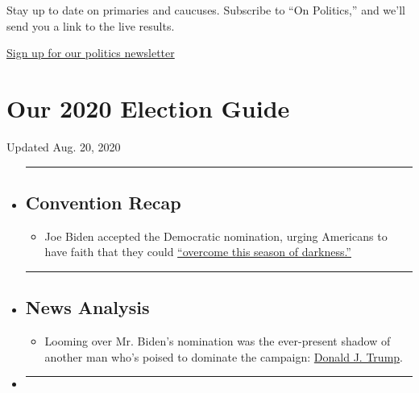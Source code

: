 Stay up to date on primaries and caucuses. Subscribe to ``On Politics,''
and we'll send you a link to the live results.

\href{https://www.nytimes3xbfgragh.onion/newsletters/politics}{Sign up
for our politics newsletter}

\hypertarget{our-2020-election-guide}{%
\section{Our 2020 Election Guide}\label{our-2020-election-guide}}

Updated Aug. 20, 2020

\begin{itemize}
\item
  \begin{center}\rule{0.5\linewidth}{\linethickness}\end{center}

  \hypertarget{convention-recap}{%
  \subsection{Convention Recap}\label{convention-recap}}

  \begin{itemize}
  \tightlist
  \item
    Joe Biden accepted the Democratic nomination, urging Americans to
    have faith that they could
    \href{https://www.nytimes3xbfgragh.onion/2020/08/20/us/politics/Joe-Biden-accepts-democratic-nomination.html?action=click\&pgtype=Article\&state=default\&region=BELOW_MAIN_CONTENT\&context=storylines_guide}{``overcome
    this season of darkness.''}
  \end{itemize}
\item
  \begin{center}\rule{0.5\linewidth}{\linethickness}\end{center}

  \hypertarget{news-analysis}{%
  \subsection{News Analysis}\label{news-analysis}}

  \begin{itemize}
  \tightlist
  \item
    Looming over Mr. Biden's nomination was the ever-present shadow of
    another man who's poised to dominate the campaign:
    \href{https://www.nytimes3xbfgragh.onion/2020/08/20/us/politics/biden-dnc-speech-trump.html?action=click\&pgtype=Article\&state=default\&region=BELOW_MAIN_CONTENT\&context=storylines_guide}{Donald
    J. Trump}.
  \end{itemize}
\item
  \begin{center}\rule{0.5\linewidth}{\linethickness}\end{center}


\end{itemize}
